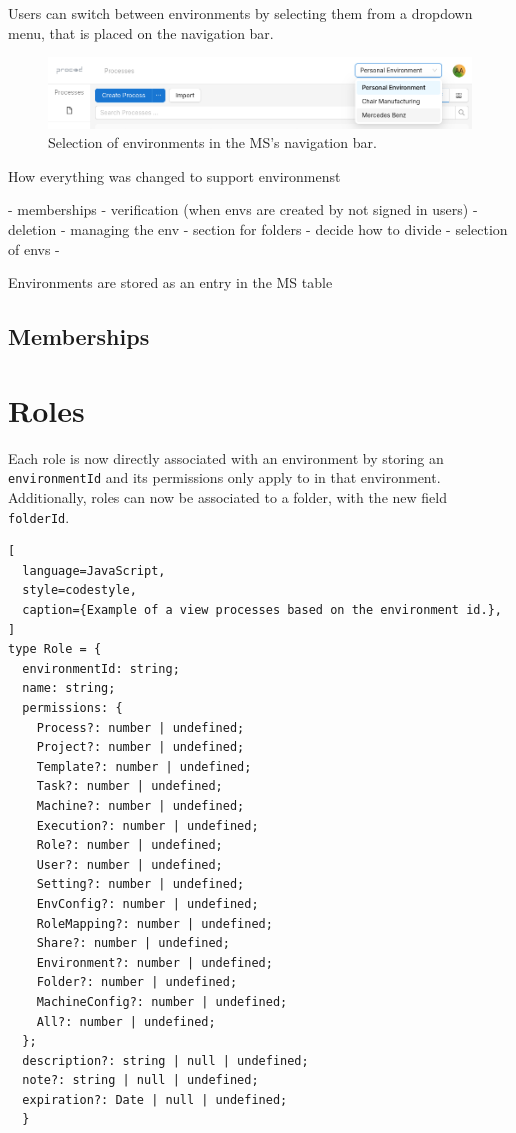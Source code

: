 Users can switch between environments by selecting them from a dropdown menu, that is
placed on the navigation bar.


\begin{figure}[H]
    \centering
    \includegraphics[scale=0.3]{images/select-environment.png}
    \caption{Selection of environments in the MS's navigation bar.}
    \vspace{-1em} %
\end{figure}

How everything was changed to support environmenst

- memberships
- verification (when envs are created by not signed in users)
- deletion - managing the env
- section for folders
- decide how to divide 
- selection of envs
- 

Environments are stored as an entry in the MS table

\subsection{Memberships}

\section{Roles}

Each role is now directly associated with an environment by storing an
\lstinline{environmentId} and its permissions only apply to in that environment.
Additionally, roles can now be associated to a folder, with the new field \lstinline{folderId}. 



\begin{lstlisting}[
  language=JavaScript,
  style=codestyle,
  caption={Example of a view processes based on the environment id.},
]
type Role = {
  environmentId: string;
  name: string;
  permissions: {
    Process?: number | undefined;
    Project?: number | undefined;
    Template?: number | undefined;
    Task?: number | undefined;
    Machine?: number | undefined;
    Execution?: number | undefined;
    Role?: number | undefined;
    User?: number | undefined;
    Setting?: number | undefined;
    EnvConfig?: number | undefined;
    RoleMapping?: number | undefined;
    Share?: number | undefined;
    Environment?: number | undefined;
    Folder?: number | undefined;
    MachineConfig?: number | undefined;
    All?: number | undefined;
  };
  description?: string | null | undefined;
  note?: string | null | undefined;
  expiration?: Date | null | undefined;
  }
\end{lstlisting}

